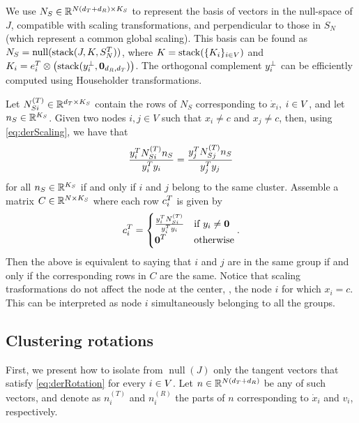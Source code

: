 \documentclass[12pt]{article}
\DeclareMathOperator{\nullspace}{null}
\newcommand{\dx}{\dot{x}}
\newcommand{\dxi}{\dot{x}_i}
\newcommand{\kron}{\otimes}
\newcommand{\niT}{n_i^{(T)}}
\newcommand{\niR}{n_i^{(R)}}
\begin{document}

We use $N_S \in \mathbb{R}^{N(d_T+d_R)\times K_S}{}$ to represent the basis of vectors in the null-space of $J$, compatible with scaling transformations, and perpendicular to those in $S_N$ (which represent a common global scaling). This basis can be found as $N_S=\nullspace(\stack(J,K,S_N\transpose))$, where $K=\operatorname{stack}(\{K_i\}_{i \in V})$ and $K_i=e_i\transpose\kron\bigl(\stack(y_i\orth, \vct{0}_{d_R,d_T})\bigr)$. The orthogonal complement $y_i^{\bot}$ can be efficiently computed using Householder transformations. 


Let $N_{Si}^{(T)} \in \mathbb{R}^{d_T\times K_S}{}$ contain the rows of $N_S$ corresponding to $\dx_i$, ${i \in V}$, and let $n_S\in\mathbb{R}^{K_S}{}$. Given two nodes $i,j\in V$ such that $x_i\neq c$ and $x_j\neq c$, then, using \eqref{eq:derScaling}, we have that
\begin{equation}
  \frac{y_i^T N_{Si}^{(T)} n_S}{y_i^T y_i}=\frac{y_j^T N_{Sj}^{(T)} n_S}{y_j^T y_j}
\end{equation}
for all $n_S\in\mathbb{R}^{K_S}{}$ if and only if $i$ and $j$ belong to the same cluster. Assemble a matrix $C\in\mathbb{R}^{N\times K_S}{}$ where each row $c_i^T$ is given by 
\begin{equation}
    c_i^T=\begin{cases} \frac{y_i^T N_{Si}^{(T)}}{y_i^T y_i} & \textrm{if } y_i\neq\boldsymbol{0}\\\boldsymbol{0}^T & \textrm{otherwise}\end{cases}.
\end{equation}
Then the above is equivalent to saying that $i$ and $j$ are in the same group if and only if the corresponding rows in $C$ are the same. Notice that scaling trasformations do not affect the node at the center, \ie, the node $i$ for which $x_i=c$. This can be interpreted as node $i$ simultaneously belonging to all the groups.

\subsection{Clustering rotations}
First, we present how to isolate from $\nullspace(J)$ only the tangent vectors that satisfy \eqref{eq:derRotation} for every ${i \in V}$. Let $n\in\mathbb{R}^{N(d_T+d_R)}{}$ be any of such vectors, and denote as $\niT$ and $\niR$ the parts of $n$ corresponding to $\dxi$ and $v_i$, respectively.
\end{document}
